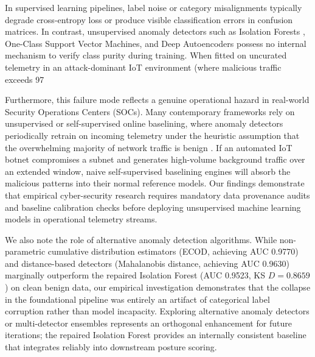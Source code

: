 \documentclass[journal,10pt,onecolumn]{IEEEtran}
\begin{document}
In supervised learning pipelines, label noise or category misalignments typically degrade cross-entropy loss or produce visible classification errors in confusion matrices. In contrast, unsupervised anomaly detectors such as Isolation Forests \cite{15}, One-Class Support Vector Machines, and Deep Autoencoders possess no internal mechanism to verify class purity during training. When fitted on uncurated telemetry in an attack-dominant IoT environment (where malicious traffic exceeds 97%

Furthermore, this failure mode reflects a genuine operational hazard in real-world Security Operations Centers (SOCs). Many contemporary frameworks rely on unsupervised or self-supervised online baselining, where anomaly detectors periodically retrain on incoming telemetry under the heuristic assumption that the overwhelming majority of network traffic is benign \cite{16, 17}. If an automated IoT botnet compromises a subnet and generates high-volume background traffic over an extended window, naive self-supervised baselining engines will absorb the malicious patterns into their normal reference models. Our findings demonstrate that empirical cyber-security research requires mandatory data provenance audits and baseline calibration checks before deploying unsupervised machine learning models in operational telemetry streams.

We also note the role of alternative anomaly detection algorithms. While non-parametric cumulative distribution estimators (ECOD, achieving AUC 0.9770) and distance-based detectors (Mahalanobis distance, achieving AUC 0.9630) marginally outperform the repaired Isolation Forest (AUC 0.9523, KS $D = 0.8659$) on clean benign data, our empirical investigation demonstrates that the collapse in the foundational pipeline \cite{1} was entirely an artifact of categorical label corruption rather than model incapacity. Exploring alternative anomaly detectors or multi-detector ensembles represents an orthogonal enhancement for future iterations; the repaired Isolation Forest provides an internally consistent baseline that integrates reliably into downstream posture scoring.
\end{document}
